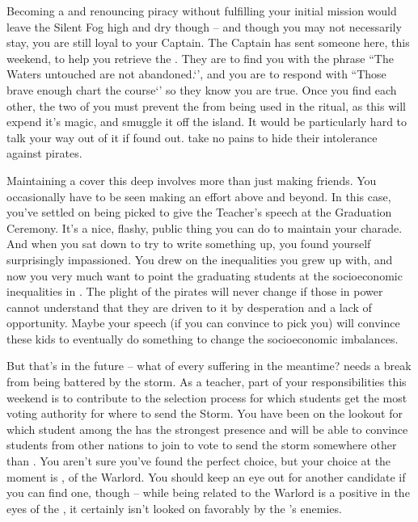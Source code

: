 \documentclass[char]{GL2020}
\begin{document}
Becoming a \cPirate{\cleric} and renouncing piracy without fulfilling your initial mission would leave the Silent Fog high and dry though -- and though you may not necessarily stay, you are still loyal to your Captain. The Captain has sent someone here, this weekend, to help you retrieve the \iNet{}. They are to find you with the phrase ``The Waters untouched are not abandoned.‘', and you are to respond with ``Those brave enough chart the course‘' so they know you are true. Once you find each other, the two of you must prevent the \iNet{} from being used in the ritual, as this will expend it's magic, and smuggle it off the island. It would be particularly hard to talk your way out of it if \cPrincipal{} found out. \cPrincipal{\They} take no pains to hide their intolerance against pirates.

Maintaining a cover this deep involves more than just making friends. You occasionally have to be seen making an effort above and beyond. In this case, you've settled on being picked to give the Teacher's speech at the Graduation Ceremony. It's a nice, flashy, public thing you can do to maintain your charade. And when you sat down to try to write something up, you found yourself surprisingly impassioned. You drew on the inequalities you grew up with, and now you very much want to point the graduating students at the socioeconomic inequalities in \pEarth{}. The plight of the pirates will never change if those in power cannot understand that they are driven to it by desperation and a lack of opportunity. Maybe your speech (if you can convince \cMusic{} to pick you) will convince these kids to eventually do something to change the socioeconomic imbalances. 

But that's in the future -- what of every suffering in the meantime? \pShip{} needs a break from being battered by the storm. As a teacher, part of your responsibilities this weekend is to contribute to the selection process for which students get the most voting authority for where to send the Storm. You have been on the lookout for which student among the \pShippies{} has the strongest presence and will be able to convince students from other nations to join to vote to send the storm somewhere other than \pShip{}. You aren't sure you've found the perfect choice, but your choice at the moment is \cWarlordDaughter{}, \cWarlordDaughter{\child} of the \pShip{} Warlord. You should keep an eye out for another candidate if you can find one, though -- while being related to the Warlord is a positive in the eyes of the \pShip{}, it certainly isn't looked on favorably by the \pShip{}'s enemies.
\end{document}

